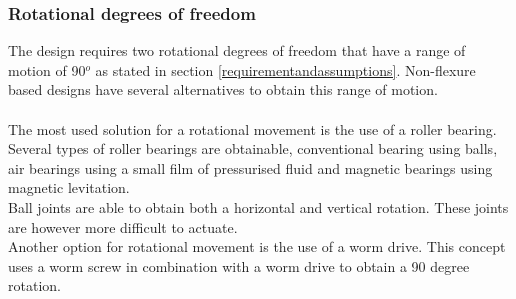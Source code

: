 \subsubsection{Rotational degrees of freedom}
The design requires two rotational degrees of freedom that have a range of motion of 90$^o$ as stated in section \ref{requirementandassumptions}. Non-flexure based designs have several alternatives to obtain this range of motion. \\\\
The most used solution for a rotational movement is the use of a roller bearing. Several types of roller bearings are obtainable, conventional bearing using balls, air bearings using a small film of pressurised fluid and magnetic bearings using magnetic levitation. \\
Ball joints are able to obtain both a horizontal and vertical rotation. These joints are however more difficult to actuate. \\
Another option for rotational movement is the use of a worm drive. This concept uses a worm screw in combination with a worm drive to obtain a 90 degree rotation. 

